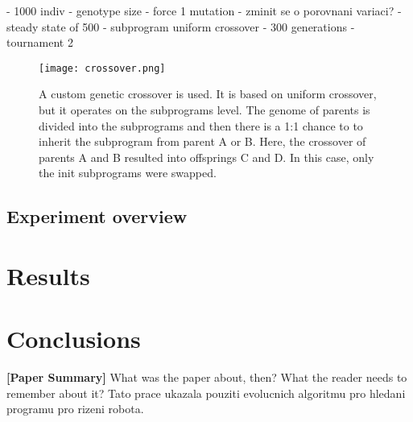 \documentclass{ExcelAtFIT}
\begin{document}
 - 1000 indiv
 - genotype size
 - force 1 mutation
 - zminit se o porovnani variaci?
 - steady state of 500
 - subprogram uniform crossover
 - 300 generations
 - tournament 2

\begin{figure}[t]
	\centering
	{\texttt{[image: crossover.png]}}
	\caption{
	A custom genetic crossover is used.
	It is based on uniform crossover, but it operates on the subprograms level.
	The genome of parents is divided into the subprograms and then there is a 1:1 chance to to inherit the subprogram from parent A or B.
	Here, the crossover of parents A and B resulted into offsprings C and D.
	In this case, only the init subprograms were swapped.
	}
	\label{fig:Crossover}
\end{figure}


\subsection{Experiment overview}




\section{Results}



\section{Conclusions}
\label{sec:Conclusions}

\textbf{[Paper Summary]} What was the paper about, then? What the reader needs to remember about it?
Tato prace ukazala pouziti evolucnich algoritmu pro hledani programu pro rizeni robota. 
\end{document}
